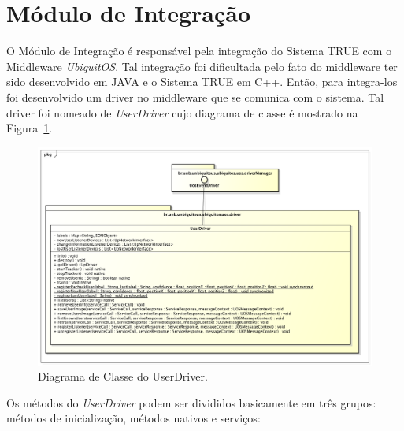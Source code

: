 \section{Módulo de Integração}

O Módulo de Integração é responsável pela integração do Sistema TRUE  com o Middleware \textit{UbiquitOS}. Tal integração foi dificultada pelo fato do middleware ter sido desenvolvido em JAVA e o Sistema TRUE em C++. Então, para integra-los foi desenvolvido um driver no middleware que se comunica com o sistema. Tal driver foi nomeado de \textit{UserDriver} cujo diagrama de classe é mostrado na Figura~\ref{fig:userdriver}.

	\begin{figure}[hbt]
		\begin{center}
			\includegraphics[scale=0.45]{figuras/4.ProblemaEProposta/diagrama-classe-userdriver.png}
		\end{center}
		\caption{Diagrama de Classe do UserDriver.}
		\label{fig:userdriver}
	\end{figure}

Os métodos do \textit{UserDriver} podem ser divididos basicamente em três grupos: métodos de inicialização, métodos nativos e serviços:

